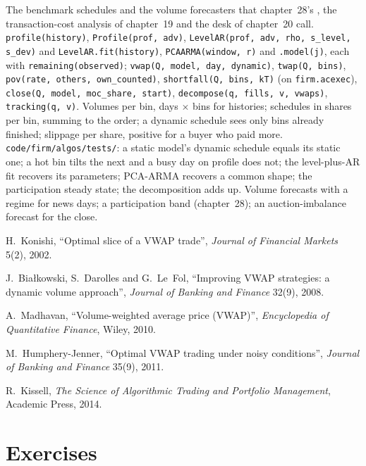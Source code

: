 \begin{build}
 The benchmark schedules and the volume forecasters that chapter~28's , the transaction-cost analysis of
chapter~19 and the desk of chapter~20 call.
 \texttt{profile(history)}, \texttt{Profile(prof, adv)}, \texttt{LevelAR(prof, adv, rho, s\_level, s\_dev)} and
\texttt{LevelAR.fit(history)}, \texttt{PCAARMA(window, r)} and \texttt{.model(j)}, each with \texttt{remaining(observed)};
\texttt{vwap(Q, model, day, dynamic)}, \texttt{twap(Q, bins)}, \texttt{pov(rate, others, own\_counted)}, \texttt{shortfall(Q, bins, kT)} (on
\texttt{firm.acexec}), \texttt{close(Q, model, moc\_share, start)}, \texttt{decompose(q, fills, v, vwaps)}, \texttt{tracking(q, v)}.
 Volumes per bin, days $\times$ bins for histories; schedules in shares per bin, summing to the order; a dynamic schedule sees only bins
already finished; slippage per share, positive for a buyer who paid more.
 \texttt{code/firm/algos/tests/}: a static model's dynamic schedule equals its static one; a hot bin tilts the next and a busy
day on profile does not; the level-plus-AR fit recovers its parameters; PCA-ARMA recovers a common shape; the participation steady state; the
decomposition adds up.
 Volume forecasts with a regime for news days; a participation band (chapter~28); an auction-imbalance forecast for the close.
\end{build}

\begin{omsources}
\item H.~Konishi, ``Optimal slice of a VWAP trade'', \emph{Journal of Financial Markets} 5(2), 2002.
\item J.~Białkowski, S.~Darolles and G.~Le~Fol, ``Improving VWAP strategies: a dynamic volume approach'', \emph{Journal of Banking and Finance}
32(9), 2008.
\item A.~Madhavan, ``Volume-weighted average price (VWAP)'', \emph{Encyclopedia of Quantitative Finance}, Wiley, 2010.
\item M.~Humphery-Jenner, ``Optimal VWAP trading under noisy conditions'', \emph{Journal of Banking and Finance} 35(9), 2011.
\item R.~Kissell, \emph{The Science of Algorithmic Trading and Portfolio Management}, Academic Press, 2014.
\end{omsources}

\section{Exercises}


